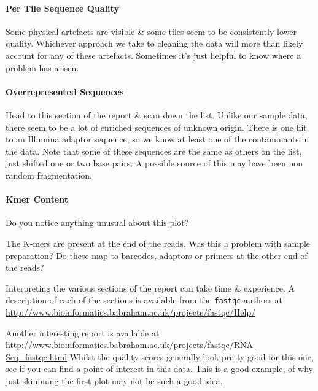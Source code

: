 \paragraph{Per Tile Sequence Quality}
Some physical artefacts are visible \& some tiles seem to be consistently lower quality.
Whichever approach we take to cleaning the data will more than likely account for any of these artefacts.
Sometimes it's just helpful to know where a problem has arisen.

\paragraph{Overrepresented Sequences}
Head to this section of the report \& scan down the list.
Unlike our sample data, there seem to be a lot of enriched sequences of unknown origin.
There is one hit to an Illumina adaptor sequence, so we know at least one of the contaminants in the data.
Note that some of these sequences are the same as others on the list, just shifted one or two base pairs.
A possible source of this may have been non random fragmentation.

\paragraph{Kmer Content}
\begin{questions}
Do you notice anything unusual about this plot?\\
\begin{answer}
The K-mers are present at the end of the reads.
Was this a problem with sample preparation? 
Do these map to barcodes, adaptors or primers at the other end of the reads? \\
\end{answer}
\end{questions}

\begin{information}
Interpreting the various sections of the report can take time \& experience.
A description of each of the sections is available from the \texttt{fastqc} authors at \url{http://www.bioinformatics.babraham.ac.uk/projects/fastqc/Help/}
\end{information}

\begin{bonus}
Another interesting report is available at \url{http://www.bioinformatics.babraham.ac.uk/projects/fastqc/RNA-Seq_fastqc.html}
Whilst the quality scores generally look pretty good for this one, see if you can find a point of interest in this data.
This is a good example, of why just skimming the first plot may not be such a good idea.
\end{bonus}

